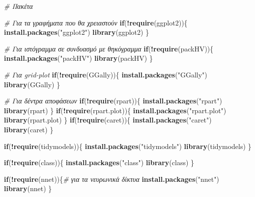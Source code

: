 \documentclass[
]{article}
\newenvironment{Shaded}{\begin{snugshade}}{\end{snugshade}}
\newcommand{\CommentTok}[1]{\textcolor[rgb]{0.56,0.35,0.01}{\textit{#1}}}
\newcommand{\ControlFlowTok}[1]{\textcolor[rgb]{0.13,0.29,0.53}{\textbf{#1}}}
\newcommand{\FunctionTok}[1]{\textcolor[rgb]{0.13,0.29,0.53}{\textbf{#1}}}
\newcommand{\NormalTok}[1]{#1}
\newcommand{\SpecialCharTok}[1]{\textcolor[rgb]{0.81,0.36,0.00}{\textbf{#1}}}
\newcommand{\StringTok}[1]{\textcolor[rgb]{0.31,0.60,0.02}{#1}}
\begin{document}
\begin{Shaded}
\begin{Highlighting}[]
\CommentTok{\# Πακέτα}

\CommentTok{\# Για τα γραφήματα που θα χρειαστούν}
\ControlFlowTok{if}\NormalTok{(}\SpecialCharTok{!}\FunctionTok{require}\NormalTok{(ggplot2))\{}
  \FunctionTok{install.packages}\NormalTok{(}\StringTok{"ggplot2"}\NormalTok{)}
  \FunctionTok{library}\NormalTok{(ggplot2)}
\NormalTok{\}}

\CommentTok{\# Για ιστόγραμμα σε συνδυασμό με θηκόγραμμα}
\ControlFlowTok{if}\NormalTok{(}\SpecialCharTok{!}\FunctionTok{require}\NormalTok{(packHV))\{}
    \FunctionTok{install.packages}\NormalTok{(}\StringTok{"packHV"}\NormalTok{)}
    \FunctionTok{library}\NormalTok{(packHV)}
\NormalTok{\}}

\CommentTok{\# Για grid{-}plot}
\ControlFlowTok{if}\NormalTok{(}\SpecialCharTok{!}\FunctionTok{require}\NormalTok{(GGally))\{}
    \FunctionTok{install.packages}\NormalTok{(}\StringTok{"GGally"}\NormalTok{)}
    \FunctionTok{library}\NormalTok{(GGally)}
\NormalTok{\}}

\CommentTok{\# Για δέντρα αποφάσεων}
\ControlFlowTok{if}\NormalTok{(}\SpecialCharTok{!}\FunctionTok{require}\NormalTok{(rpart))\{}
    \FunctionTok{install.packages}\NormalTok{(}\StringTok{"rpart"}\NormalTok{)}
    \FunctionTok{library}\NormalTok{(rpart)}
\NormalTok{\}}
\ControlFlowTok{if}\NormalTok{(}\SpecialCharTok{!}\FunctionTok{require}\NormalTok{(rpart.plot))\{}
    \FunctionTok{install.packages}\NormalTok{(}\StringTok{"rpart.plot"}\NormalTok{)}
    \FunctionTok{library}\NormalTok{(rpart.plot)}
\NormalTok{\}}
\ControlFlowTok{if}\NormalTok{(}\SpecialCharTok{!}\FunctionTok{require}\NormalTok{(caret))\{}
    \FunctionTok{install.packages}\NormalTok{(}\StringTok{"caret"}\NormalTok{)}
    \FunctionTok{library}\NormalTok{(caret)}
\NormalTok{\}}

\ControlFlowTok{if}\NormalTok{(}\SpecialCharTok{!}\FunctionTok{require}\NormalTok{(tidymodels))\{}
    \FunctionTok{install.packages}\NormalTok{(}\StringTok{"tidymodels"}\NormalTok{)}
    \FunctionTok{library}\NormalTok{(tidymodels)}
\NormalTok{\}}

\ControlFlowTok{if}\NormalTok{(}\SpecialCharTok{!}\FunctionTok{require}\NormalTok{(class))\{}
    \FunctionTok{install.packages}\NormalTok{(}\StringTok{"class"}\NormalTok{)}
    \FunctionTok{library}\NormalTok{(class)}
\NormalTok{\}}

\ControlFlowTok{if}\NormalTok{(}\SpecialCharTok{!}\FunctionTok{require}\NormalTok{(nnet))\{}\CommentTok{\# για τα νευρωνικά δίκτυα}
    \FunctionTok{install.packages}\NormalTok{(}\StringTok{"nnet"}\NormalTok{)}
    \FunctionTok{library}\NormalTok{(nnet)}
\NormalTok{\}}


\end{Highlighting}
\end{Shaded}
\end{document}
